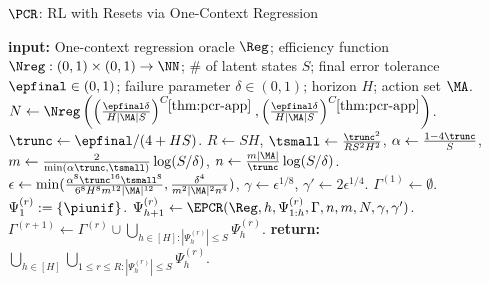 \begin{algorithm}[t]
	\caption{$\PCR$: RL with Resets via One-Context Regression}
	\label{alg:pcr}
	\begin{algorithmic}[1]\onehalfspacing
		          \State \textbf{input:} One-context regression oracle $\Reg$; efficiency function $\Nreg: (0,1)\times(0,1)\to\NN$; \# of latent states $S$; final error tolerance $\epfinal \in (0,1)$; failure parameter $\delta \in (0,1)$; horizon $H$; action set $\MA$.
        \State $N \gets \Nreg\left(\left(\frac{\epfinal\delta}{H|\MA|S}\right)^{C_{\ref{thm:pcr-app}}},\left(\frac{\epfinal\delta}{H|\MA|S}\right)^{C_{\ref{thm:pcr-app}}}\right)$.
        \State $\trunc \gets \epfinal/(4+HS)$.
        \State $R \gets SH$, $\tsmall \gets \frac{\trunc^2}{RS^2H^2}$, $\alpha \gets \frac{1-4\trunc}{S}$, $m \gets \frac{2}{\min(\alpha\trunc,\tsmall)}\log(S/\delta)$, $n \gets \frac{m|\MA|}{\trunc}\log(S/\delta)$.
        \State $\epsilon \gets \min(\frac{\alpha^8\trunc^{16}\tsmall^{8}}{6^{8}H^{8}m^{12}|\MA|^{12}}, \frac{\delta^4}{m^2|\MA|^2n^4})$, $\gamma \gets \epsilon^{1/8}$, $\gamma' \gets 2\epsilon^{1/4}$.
        \State $\Gamma^{(1)} \gets \emptyset$.
            \State $\Psi_1^{(r)} := \{\piunif\}$.
                \State $\Psi_{h+1}^{(r)} \gets \EPCR(\Reg, h, \Psi_{1:h}^{(r)}, \Gamma,n,m,N,\gamma,\gamma')$.
            \EndFor
            \State $\Gamma^{(r+1)} \gets \Gamma^{(r)} \cup \bigcup_{h \in [H]:|\Psi_h^{(r)}| \leq S} \Psi_h^{(r)}$.
        \EndFor
        \State \textbf{return:} $\bigcup_{h \in [H]} \bigcup_{1 \leq r \leq R: |\Psi_h^{(r)}| \leq S} \Psi_h^{(r)}$.
	\end{algorithmic}
\end{algorithm}


